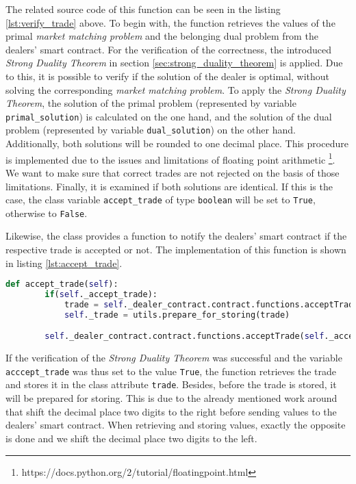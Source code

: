 The related source code of this function can be seen in the listing \ref{lst:verify_trade} above. 
To begin with, the function retrieves the values of the primal \textit{market matching problem} and
the belonging dual problem from the dealers' smart contract. For the verification of the correctness, the introduced \textit{Strong Duality Theorem}
in section \ref{sec:strong_duality_theorem} is applied. 
Due to this, it is possible to verify if the solution of the dealer is optimal, without solving the corresponding
\textit{market matching problem}.
To apply the \textit{Strong Duality Theorem}, the solution of the primal problem (represented by variable \verb|primal_solution|) is calculated
on the one hand, and the solution of the dual problem (represented by variable \verb|dual_solution|) on the other hand.
Additionally, both solutions will be rounded to one decimal place. This procedure is implemented due to the issues and limitations of 
floating point arithmetic \footnote{https://docs.python.org/2/tutorial/floatingpoint.html}. 
We want to make sure that correct trades are not rejected on the basis of those limitations.
Finally, it is examined if both solutions are identical. If this is the case, the class variable \verb|accept_trade| of type \verb|boolean| will be
set to \verb|True|, otherwise to \verb|False|.

Likewise, the class provides a function to notify the dealers' smart contract if the respective trade is accepted or not.
The implementation of this function is shown in listing \ref{lst:accept_trade}.

\begin{lstlisting}[float=htbp, label=lst:accept_trade, caption=Notification of trade acceptance, language=Python]
    def accept_trade(self):
        if(self._accept_trade):
            trade = self._dealer_contract.contract.functions.acceptTrade(self._accept_trade).call({'from': self._account_address})
            self._trade = utils.prepare_for_storing(trade)

        self._dealer_contract.contract.functions.acceptTrade(self._accept_trade).transact({'from': self._account_address})

\end{lstlisting}

If the verification of the \textit{Strong Duality Theorem} was successful and the variable \verb|acccept_trade| was thus set to the value \verb|True|,
the function retrieves the trade and stores it in the class attribute \verb|trade|. Besides, before the trade is stored, it will be 
prepared for storing. This is due to the already mentioned work around that shift the decimal place two digits to the right before 
sending values to the dealers' smart contract. When retrieving and storing values, exactly the opposite is done and we shift the decimal place 
two digits to the left. 

